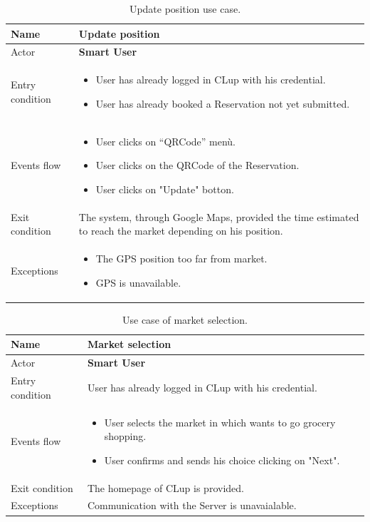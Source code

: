 \begin{table}[H]\begin{tabular}{|p{5cm} | p{7cm} | }
	\hline
	Name & \textbf{Update position}  \\
	\hline
	Actor & \textbf{Smart User} \\
	\hline
	Entry condition &
	\begin{itemize}
	    \item User has already logged in CLup with his credential. 
		\item User has already booked a Reservation not yet submitted.
        \end{itemize} \\
	\hline
	Events flow & 
	\begin{itemize}
		\item User clicks on “QRCode” menù.
        \item User clicks on the QRCode of the Reservation.
        \item User clicks on "Update" botton.
	\end{itemize} \\
	\hline
	Exit condition &
	The system, through Google Maps, provided the time estimated to reach the market depending on his position. \\
	\hline 
	Exceptions & 
	\begin{itemize}
		\item The GPS position too far from market.
		\item GPS is unavailable.
	\end{itemize} \\
	\hline
\end{tabular}
\caption{Update position use case.}

\end{table}

\bigbreak

\begin{table}[H]\begin{tabular}{|p{5cm} | p{7cm} | }
	\hline
	Name & \textbf{Market selection}  \\
	\hline
	Actor & \textbf{Smart User} \\
	\hline
	Entry condition & User has already logged in CLup with his credential. \\
	\hline
	Events flow & 
	\begin{itemize}
		\item User selects the market in which wants to go grocery shopping.
		\item User confirms and sends his choice clicking on "Next". 
	\end{itemize} \\
	\hline
	Exit condition &
	The homepage of CLup is provided.  \\
	\hline 
	Exceptions & Communication with the Server is unavaialable.\\
	\hline
\end{tabular}
\caption{Use case of market selection.}
\end{table}


